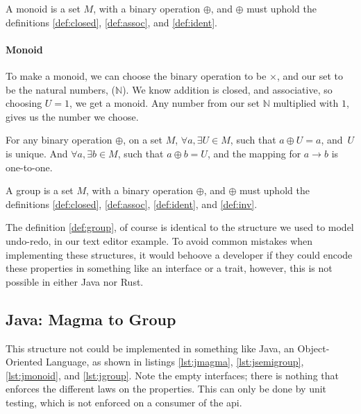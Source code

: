 \begin{definition}[Monoid] \label{def:monoid}
  A monoid is a set $M$, with a binary operation $\oplus$, and $\oplus$ must
  uphold the definitions \ref{def:closed}, \ref{def:assoc}, and \ref{def:ident}.
\end{definition}

\paragraph{Monoid} To make a monoid, we can choose the binary operation to be
  $\times$, and our set to be the natural numbers, ($\mathbb{N}$). We know addition
  is closed, and associative, so choosing $U = 1$, we get a monoid. Any number
  from our set $\mathbb{N}$ multiplied with $1$, gives us the number we choose.

\begin{definition} \label{def:inv}
  For any binary operation $\oplus$, on a set $M$,
  $\forall a, \exists U \in M$, such that
  $a \oplus U = a$, and $U$ is unique.
  And $\forall a, \exists b \in M$, such that $a \oplus b = U$, and the mapping
  for $a \to b$ is one-to-one.
\end{definition}

\begin{definition}[Group] \label{def:group}
  A group is a set $M$, with a binary operation $\oplus$, and $\oplus$ must
  uphold the definitions \ref{def:closed}, \ref{def:assoc}, \ref{def:ident},
  and \ref{def:inv}.
\end{definition}

The definition \ref{def:group}, of course is identical to the structure we used
to model undo-redo, in our text editor example. To avoid common mistakes when
implementing these structures, it would behoove a developer if they could encode
these properties in something like an interface or a trait, however, this is not
possible in either Java nor Rust.


\subsection{Java: Magma to Group}

This structure not could be implemented in something like Java, an
Object-Oriented Language, as shown in listings \ref{lst:jmagma},
\ref{lst:jsemigroup}, \ref{lst:jmonoid}, and \ref{lst:jgroup}. Note the empty
interfaces; there is nothing that enforces the different laws on the properties.
This can only be done by unit testing, which is not enforced on a consumer of
the \gls{api}.

